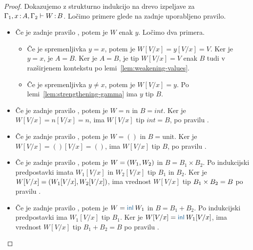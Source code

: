 \begin{proof}
	Dokazujemo z strukturno indukcijo na drevo izpeljave za $\Gamma_1, x \mathinner{:} A, \Gamma_2 \vdash W \mathinner{:} B$.
	Ločimo primere glede na zadnje uporabljeno pravilo.
	
	\begin{itemize}
		\item[\sitem] 
		Če je zadnje pravilo , potem je $W$ enak $y$. Ločimo dva primera.
		\begin{itemize}
			\item Če je spremenljivka $y = x$, potem je $W[V/x] = y[V/x] = V$. Ker je $y = x$, je $A = B$. Ker je $A = B$, je tip $W[V/x] = V$ enak $B$ tudi v razširjenem kontekstu po lemi~\ref{lem:weakening-values}.
			\item Če je spremenljivka $y \neq x$, potem je $W[V/x] = y$. Po lemi~\ref{lem:strengthening-gamma} ima $y$ tip $B$.
		\end{itemize}
		
	
		\item Če je zadnje pravilo , potem je $W=n$ in $B=int$. Ker je $W[V/x] = n[V/x] = n$, ima $W[V/x]$ tip $int = B$, po pravilu .
		
		\item Če je zadnje pravilo , potem je $W=()$ in $B=\text{unit}$. Ker je $W[V/x] = ()[V/x] = ()$, ima $W[V/x]$ tip $B$, po pravilu .
		
		\item Če je zadnje pravilo , potem je $W =( W_1 , W_2 )$ in $B = B_1 \times B_2$. Po indukcijski predpostavki imata $W_1[V/x]$ in $W_2[V/x]$ tip $B_1$ in $B_2$.
		Ker je $W[V/x] = ( W_1[V/x] , W_2[V/x] )$, ima vrednost $W[V/x]$ tip $B_1 \times B_2 = B$ po pravilu .
		
		\item Če je zadnje pravilo , potem je $W = \tminl{W_1}$ in $B = B_1 + B_2$. Po indukcijski predpostavki ima $W_1[V/x]$ tip $B_1$.
		Ker je $W[V/x] = \tminl{W_1[V/x]}$, ima vrednost $W[V/x]$ tip $B_1 + B_2 = B$ po pravilu .
		

\end{itemize}
\end{proof}
